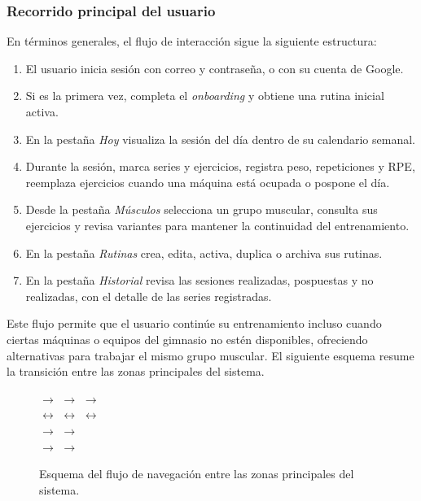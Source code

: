 \subsubsection{Recorrido principal del usuario}

En términos generales, el flujo de interacción sigue la siguiente estructura:

\begin{enumerate}
    \item El usuario inicia sesión con correo y contraseña, o con su cuenta de Google.
    \item Si es la primera vez, completa el \textit{onboarding} y obtiene una rutina inicial activa.
    \item En la pestaña \textit{Hoy} visualiza la sesión del día dentro de su calendario semanal.
    \item Durante la sesión, marca series y ejercicios, registra peso, repeticiones y RPE, reemplaza ejercicios cuando una máquina está ocupada o pospone el día.
    \item Desde la pestaña \textit{Músculos} selecciona un grupo muscular, consulta sus ejercicios y revisa variantes para mantener la continuidad del entrenamiento.
    \item En la pestaña \textit{Rutinas} crea, edita, activa, duplica o archiva sus rutinas.
    \item En la pestaña \textit{Historial} revisa las sesiones realizadas, pospuestas y no realizadas, con el detalle de las series registradas.
\end{enumerate}

Este flujo permite que el usuario continúe su entrenamiento incluso cuando ciertas máquinas o equipos del gimnasio no estén disponibles, ofreciendo alternativas para trabajar el mismo grupo muscular. El siguiente esquema resume la transición entre las zonas principales del sistema.

\begin{figure}[H]
\centering
\footnotesize
\setlength{\fboxsep}{6pt}
 $\rightarrow$  $\rightarrow$  $\rightarrow$  \\[8pt]
 $\leftrightarrow$  $\leftrightarrow$  $\leftrightarrow$  \\[8pt]
 $\rightarrow$  $\rightarrow$  \\[8pt]
 $\rightarrow$  \qquad {} $\rightarrow$ 
\caption{Esquema del flujo de navegación entre las zonas principales del sistema.}
\label{fig:flujo-navegacion}
\end{figure}

